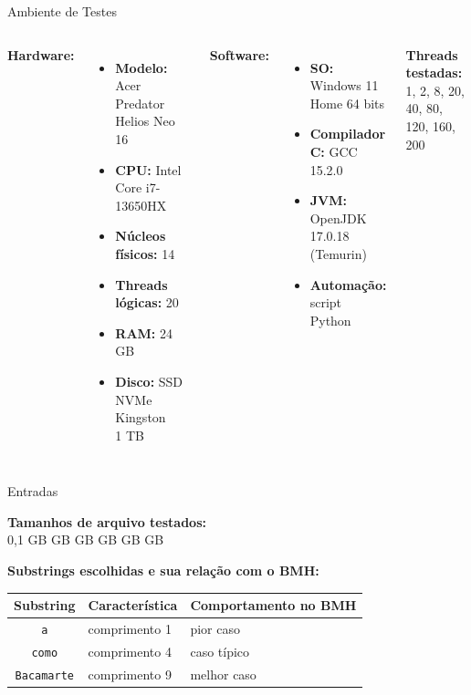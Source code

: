 \documentclass{beamer}
\begin{document}
\begin{frame}{Ambiente de Testes}

\begin{columns}
    \textbf{Hardware:}
    \begin{itemize}
        \item \textbf{Modelo:} Acer Predator Helios Neo 16
        \item \textbf{CPU:} Intel Core i7-13650HX
        \item \textbf{Núcleos físicos:} 14
        \item \textbf{Threads lógicas:} 20
        \item \textbf{RAM:} 24 GB
        \item \textbf{Disco:} SSD NVMe Kingston\\1 TB
    \end{itemize}

    \textbf{Software:}
    \begin{itemize}
        \item \textbf{SO:} Windows 11 Home 64 bits
        \item \textbf{Compilador C:} GCC 15.2.0
        \item \textbf{JVM:} OpenJDK 17.0.18 (Temurin)
        \item \textbf{Automação:} script Python
    \end{itemize}

    \vspace{0.4cm}

    \textbf{Threads testadas:}\\
    \vspace{0.1cm}
    1, 2, 8, 20, 40, 80, 120, 160, 200
\end{columns}

\end{frame}
\begin{frame}{Entradas}

\textbf{Tamanhos de arquivo testados:}\\
\vspace{0.1cm}
0,1 GB  GB  GB  GB  GB  GB

\vspace{0.4cm}

\textbf{Substrings escolhidas e sua relação com o BMH:}

\vspace{0.2cm}

\begin{tabular}{cll}
\hline
\textbf{Substring} & \textbf{Característica} & \textbf{Comportamento no BMH} \\
\hline
\texttt{a} & comprimento 1 & pior caso \\
\texttt{como} & comprimento 4 & caso típico\\
\texttt{Bacamarte} & comprimento 9 & melhor caso\\
\hline
\end{tabular}

\vspace{0.3cm}


\end{frame}
\end{document}
